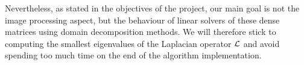 Nevertheless, as stated in the objectives of the project, our main goal is not the image processing aspect, but the behaviour of linear solvers of these dense matrices using domain decomposition methods.
We will therefore stick to computing the smallest eigenvalues of the Laplacian operator \(\operatorname{\mathcal{L}}\) and avoid spending too much time on the end of the algorithm implementation.
